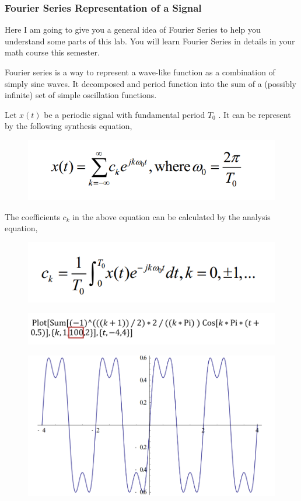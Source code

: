 \documentclass{article}
\begin{document}
\subsubsection{Fourier Series Representation of a Signal}
Here I am going to give you a general idea of Fourier Series to help you
understand some parts of this lab. You will learn Fourier Series in details in your
math course this semester.

Fourier series is a way to represent a wave-like function as a combination of
simply sine waves. It decomposed and period function into the sum of a (possibly
infinite) set of simple oscillation functions.

Let $x (t)$ be a periodic signal with fundamental period $T_0$ . It can be represent by the
following synthesis equation,
\begin{figure}[H]
	\centering
	\includegraphics[width=0.3\linewidth]{p6}
	\label{fig:p6}
\end{figure}
The coefficients
$c_k$ in the above equation can be calculated by the analysis
equation,
\begin{figure}[H]
	\centering
	\includegraphics[width=0.3\linewidth]{p7}
	\label{fig:p7}
\end{figure}
\begin{figure}[H]
	\centering
	\includegraphics[width=0.4\linewidth]{p8}
	\label{fig:p8}
\end{figure}
\begin{figure}[H]
	\centering
	\includegraphics[width=0.7\linewidth]{p9}
	\label{fig:p9}
\end{figure}
\end{document}
